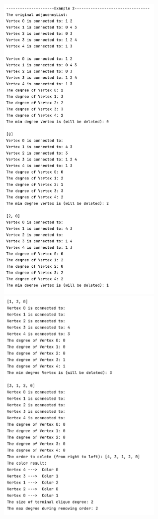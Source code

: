 \documentclass{article}
\begin{document}
\begin{enumerate}
\begin{center}
        \includegraphics[width=0.6\textwidth]{p25.png}
        \includegraphics[width=0.6\textwidth]{p26.png}

\end{center}
\end{enumerate}
\end{document}
